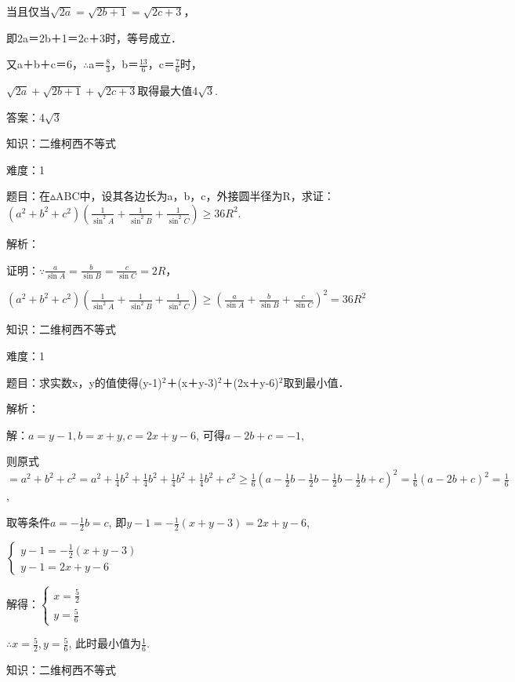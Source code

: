\documentclass{article} %
\begin{document}
当且仅当$\sqrt{2a}=\sqrt{2b+1}=\sqrt{2c+3}$，

即2a＝2b＋1＝2c＋3时，等号成立．

又a＋b＋c＝6，$\mathrm{\therefore}$a＝$\frac{8}{3}$，b＝$\frac{13}{6}$，c＝$\frac{7}{6}$时，

$\sqrt{2a}+\sqrt{2b+1}+\sqrt{2c+3}$取得最大值4$\sqrt{3}$.

 答案：4$\sqrt{3}$

 

 知识：二维柯西不等式

 难度：1

 题目：在$\mathrm{\vartriangle}$ABC中，设其各边长为a，b，c，外接圆半径为R，求证：$(a^2+b^2+c^2)(\frac{1}{\sin^2A}+\frac{1}{\sin^2B}+\frac{1}{\sin^2C})\ge 36R^2$.

 解析：

 证明：$\mathrm{\because}\frac{a}{\sin A}=\frac{b}{\sin B}=\frac{c}{\sin C}=2R$，

$(a^2+b^2+c^2)(\frac{1}{\sin^2A}+\frac{1}{\sin^2B}+\frac{1}{\sin^2C})\ge (\frac{a}{\sin A}+\frac{b}{\sin B}+\frac{c}{\sin C})^2=36R^2$


 

 知识：二维柯西不等式

 难度：1

 题目：求实数x，y的值使得(y-1)${}^{2}$＋(x＋y-3)${}^{2}$＋(2x＋y-6)${}^{2}$取到最小值．

 解析：

 解：$a=y-1, b=x+y, c=2x+y-6$, 可得$a-2b+c=-1$, 

则原式$=a^2+b^2+c^2=a^2+\frac{1}{4}b^2+\frac{1}{4}b^2+\frac{1}{4}b^2+\frac{1}{4}b^2+c^2\ge \frac{1}{6}(a-\frac{1}{2}b-\frac{1}{2}b-\frac{1}{2}b-\frac{1}{2}b+c)^2=\frac{1}{6}(a-2b+c)^2=\frac{1}{6}$,

取等条件$a=-\frac{1}{2}b=c$, 即$y-1=-\frac{1}{2}(x+y-3)=2x+y-6$,

$\left\{\begin{array}{l} y-1=-\frac{1}{2}(x+y-3)\\ y-1=2x+y-6 \end{array}\right.$

解得：$\left\{\begin{array}{l} x=\frac{5}{2}\\ y=\frac{5}{6} \end{array}\right.$

$\therefore x=\frac{5}{2}, y=\frac{5}{6}$, 此时最小值为$\frac{1}{6}$.

 

 知识：二维柯西不等式
\end{document}
